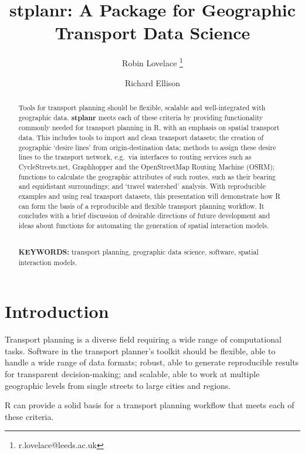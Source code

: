 \documentclass[11pt]{article}
\title{stplanr: A Package for Geographic Transport Data Science}
\author[1]{Robin Lovelace \thanks{r.lovelace@leeds.ac.uk}}
\author[2]{Richard Ellison}
\affil[1]{Institute for Transport Studies, University of Leeds}
\begin{document}
\maketitle


\begin{abstract}
\centering

Tools for transport planning should be flexible, scalable and
well-integrated with geographic data. \textbf{stplanr} meets each of
these criteria by providing functionality commonly needed for transport
planning in R, with an emphasis on spatial transport data. This includes
tools to import and clean transport datasets; the creation of geographic
`desire lines' from origin-destination data; methods to assign these
desire lines to the transport network, e.g.~via interfaces to routing
services such as CycleStreets.net, Graphhopper and the OpenStreetMap
Routing Machine (OSRM); functions to calculate the geographic attributes
of such routes, such as their bearing and equidistant surroundings; and
`travel watershed' analysis. With reproducible examples and using real
transport datasets, this presentation will demonstrate how R can form
the basis of a reproducible and flexible transport planning workflow. It
concludes with a brief discussion of desirable directions of future
development and ideas about functions for automating the generation of
spatial interaction models.

$ $ \\ {\bf KEYWORDS:} transport planning, geographic data science, software, spatial interaction models.

\end{abstract}


\section{Introduction}\label{introduction}

Transport planning is a diverse field requiring a wide range of
computational tasks. Software in the transport planner's toolkit should
be flexible, able to handle a wide range of data formats; robust, able
to generate reproducible results for transparent decision-making; and
scalable, able to work at multiple geographic levels from single streets
to large cities and regions.

R can provide a solid basis for a transport planning workflow that meets
each of these criteria.
\end{document}
